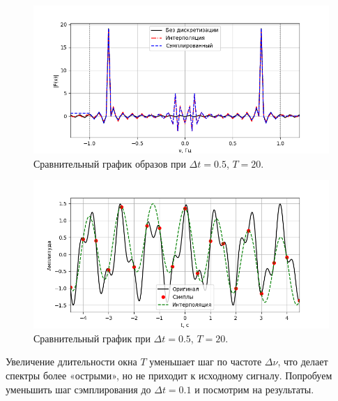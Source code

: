 \documentclass[a4paper]{article}
\begin{document}
\begin{figure}[H]
  \centering
  \includegraphics[width=\textwidth]{src/task_2/1_freq_20_0.5.png}
  \caption{Сравнительный график образов при $\Delta t=0.5$, $T=20$.} 
\end{figure}
\begin{figure}[H]
  \centering
  \includegraphics[width=\textwidth]{src/task_2/1_time_20_0.5.png}
  \caption{Сравнительный график при $\Delta t=0.5$, $T=20$.} 
\end{figure}

\noindent Увеличение длительности окна $T$ уменьшает шаг по частоте $\Delta\nu$, что делает спектры более «острыми», но не приходит к исходному сигналу.
Попробуем уменьшить шаг сэмплирования до \(\Delta t = 0.1\) и посмотрим на результаты.
\end{document}
